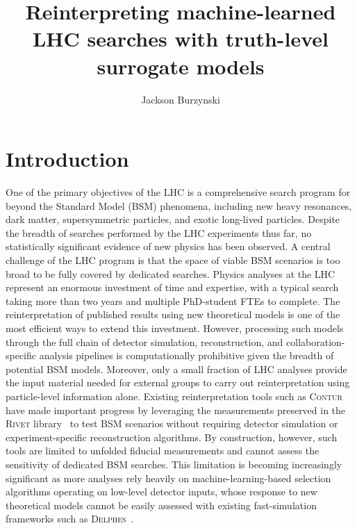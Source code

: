 \documentclass[a4paper,11pt]{article}
\title{Reinterpreting machine-learned LHC searches with truth-level surrogate models}
\author{Jackson Burzynski}
\begin{document}
\maketitle

\section{Introduction}
\label{sec:intro}

One of the primary objectives of the LHC is a comprehensive search
program for beyond the Standard Model (BSM) phenomena, including new
heavy resonances, dark matter, supersymmetric particles, and exotic
long-lived particles. Despite the breadth of searches performed by the
LHC experiments thus far, no statistically significant evidence of new
physics has been observed. A central challenge of the LHC program is
that the space of viable BSM scenarios is too broad to be fully covered
by dedicated searches. Physics analyses at the LHC represent an
enormous investment of time and expertise, with a typical search
taking more than two years and multiple PhD-student FTEs to complete.
The reinterpretation of published results using new theoretical models
is one of the most efficient ways to extend this investment. However,
processing such models through the full chain of detector simulation,
reconstruction, and collaboration-specific analysis pipelines is
computationally prohibitive given the breadth of potential BSM models.
Moreover, only a small fraction of LHC analyses provide the input
material needed for external groups to carry out reinterpretation
using particle-level information alone. Existing reinterpretation
tools such as \textsc{Contur}~\cite{Butterworth:2016sqg} have made
important progress by leveraging the measurements preserved in the
\textsc{Rivet} library~\cite{Buckley:2010ar} to test BSM scenarios
without requiring detector simulation or experiment-specific
reconstruction algorithms. By construction, however, such tools are
limited to unfolded fiducial measurements and cannot assess the
sensitivity of dedicated BSM searches. This limitation is becoming
increasingly significant as more analyses rely heavily on
machine-learning-based selection algorithms operating on low-level
detector inputs, whose response to new theoretical models cannot be
easily assessed with existing fast-simulation frameworks such as
\textsc{Delphes}~\cite{deFavereau:2013fsa}.
\end{document}
